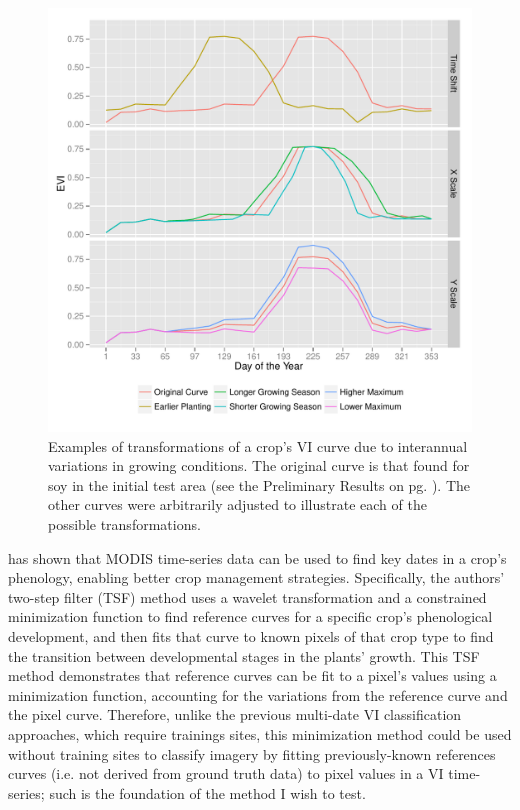 \begin{figure}
  \centering
  \includegraphics[width=\textwidth]{Graphics/transformations.pdf}
  \caption{Examples of transformations of a crop's VI curve due to interannual variations in growing conditions. The original curve is that found for soy in the initial test area (see the Preliminary Results on pg. \pageref{sec:prelim}). The other curves were arbitrarily adjusted to illustrate each of the possible transformations.}
  \label{fig:transformations}
\end{figure}

\textcites{sakamoto2005a-crop}{sakamoto2010a-two-step} has shown that MODIS time-series data can be used to find key dates in a crop’s phenology, enabling better crop management strategies. Specifically, the authors’ two-step filter (TSF) method uses a wavelet transformation and a constrained minimization function to find reference curves for a specific crop’s phenological development, and then fits that curve to known pixels of that crop type to find the transition between developmental stages in the plants’ growth. This TSF method demonstrates that reference curves can be fit to a pixel’s values using a minimization function, accounting for the variations from the reference curve and the pixel curve. Therefore, unlike the previous multi-date VI classification approaches, which require trainings sites, this minimization method could be used without training sites to classify imagery by fitting previously-known references curves (i.e. not derived from ground truth data) to pixel values in a VI time-series; such is the foundation of the method I wish to test.

